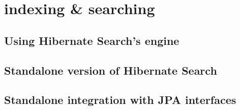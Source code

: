 \section{indexing \& searching}

\subsection{Using Hibernate Search's engine}

\subsection{Standalone version of Hibernate Search}

\subsection{Standalone integration with JPA interfaces}

\pagebreak